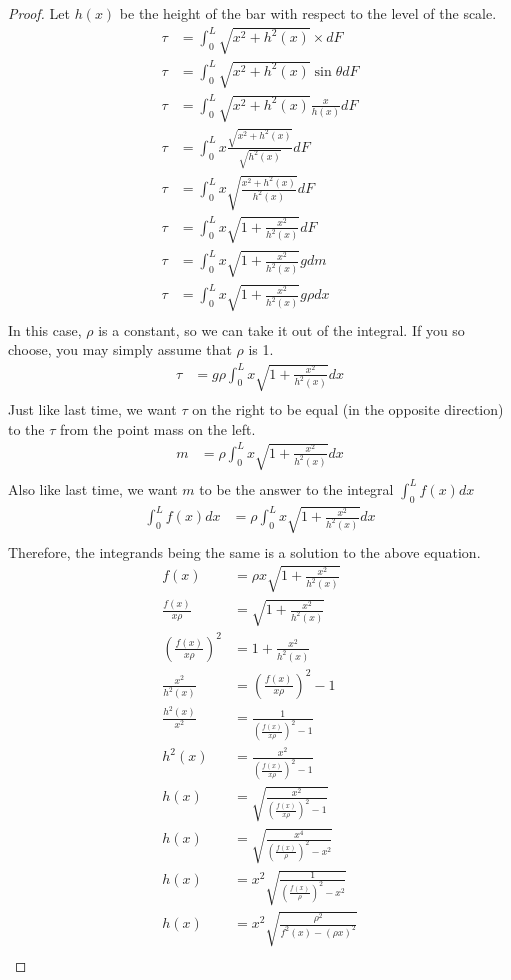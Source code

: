 \documentclass[letterpaper, 12pt]{article}
\begin{document}
\begin{proof}
	Let $h(x)$ be the height of the bar with respect to the level of the scale.
	\begin{align*}
		\tau &= \int_0^L \sqrt{x^2 + h^2(x)}\times dF\\
		\tau &= \int_0^L \sqrt{x^2 + h^2(x)}\sin\theta dF\\
		\tau &= \int_0^L \sqrt{x^2 + h^2(x)}\frac{x}{h(x)} dF\\
		\tau &= \int_0^L x\frac{\sqrt{x^2 + h^2(x)}}{\sqrt{h^2(x)}}dF\\
		\tau &= \int_0^L x\sqrt{\frac{x^2 + h^2(x)}{h^2(x)}}dF\\
		\tau &= \int_0^L x\sqrt{1 + \frac{x^2}{h^2(x)}}dF\\
		\tau &= \int_0^L x\sqrt{1 + \frac{x^2}{h^2(x)}}gdm\\
		\tau &= \int_0^L x\sqrt{1 + \frac{x^2}{h^2(x)}}g\rho dx\\
	\end{align*}
	In this case, $\rho$ is a constant, so we can take it out of the integral.
	If you so choose, you may simply assume that $\rho$ is 1.
	\begin{align*}
		\tau &= g\rho\int_0^L x\sqrt{1 + \frac{x^2}{h^2(x)}}dx\\
	\end{align*}
	Just like last time, we want $\tau$ on the right to be equal (in the opposite direction) to the $\tau$ from the point mass on the left.
	\begin{align*}
		m &= \rho\int_0^L x\sqrt{1 + \frac{x^2}{h^2(x)}}dx\\
	\end{align*}
	Also like last time, we want $m$ to be the answer to the integral $\int_0^L f(x) dx$
	\begin{align*}
		\int_0^Lf(x)dx &= \rho\int_0^L x\sqrt{1 + \frac{x^2}{h^2(x)}}dx\\
	\end{align*}
	Therefore, the integrands being the same is a solution to the above equation.
	\begin{align*}
		f(x) &= \rho x\sqrt{1 + \frac{x^2}{h^2(x)}}\\
		\frac{f(x)}{x\rho} &= \sqrt{1 + \frac{x^2}{h^2(x)}}\\
		(\frac{f(x)}{x\rho})^2 &= 1 + \frac{x^2}{h^2(x)}\\
		\frac{x^2}{h^2(x)} &= (\frac{f(x)}{x\rho})^2 - 1\\
		\frac{h^2(x)}{x^2} &= \frac{1}{(\frac{f(x)}{x\rho})^2 - 1}\\
		h^2(x) &= \frac{x^2}{(\frac{f(x)}{x\rho})^2 - 1}\\
		h(x) &= \sqrt{\frac{x^2}{(\frac{f(x)}{x\rho})^2 - 1}}\\
		h(x) &= \sqrt{\frac{x^4}{(\frac{f(x)}{\rho})^2 - x^2}}\\
		h(x) &= x^2\sqrt{\frac{1}{(\frac{f(x)}{\rho})^2 - x^2}}\\
		h(x) &= x^2\sqrt{\frac{\rho^2}{f^2(x) - (\rho x)^2}}\\
	\end{align*}
\end{proof}
\end{document}
